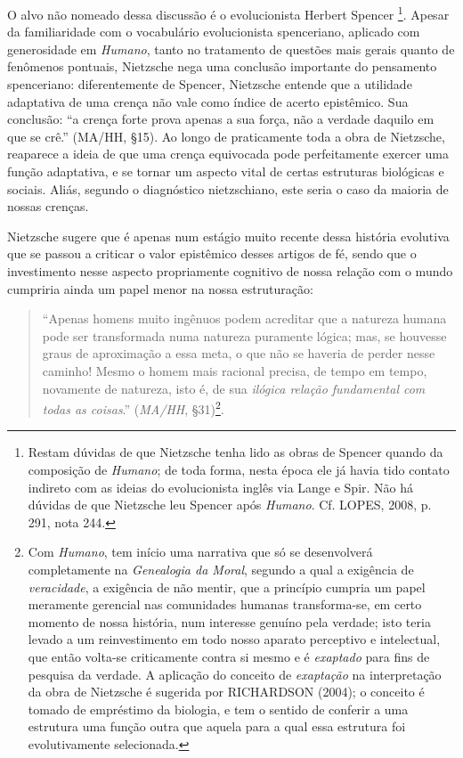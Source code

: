 \documentclass[
	12pt,				%
	openright,			%
	oneside,			%
	a4paper,			%
	english,			%
	french,				%
	spanish,			%
	brazil				%
	]{abntex2}
\begin{document}
O alvo não nomeado dessa discussão é o evolucionista Herbert Spencer
\footnote{Restam dúvidas de que Nietzsche tenha lido as obras de Spencer quando da composição de \textit{Humano}; de toda forma, nesta época ele já havia tido contato indireto com as ideias do evolucionista inglês via Lange e Spir. Não há dúvidas de que Nietzsche leu Spencer após \textit{Humano}. Cf. LOPES, 2008, p. 291, nota 244.}. 
Apesar da familiaridade com o vocabulário evolucionista spenceriano, aplicado com generosidade em \textit{Humano}, tanto no tratamento de questões mais gerais quanto de fenômenos pontuais, Nietzsche nega uma conclusão importante do pensamento spenceriano: diferentemente de Spencer, Nietzsche entende que a utilidade adaptativa de uma crença não vale como índice de acerto epistêmico. Sua conclusão: “a crença forte prova apenas a sua força, não a verdade daquilo em que se crê.” (MA/HH, §15). Ao longo de praticamente toda a obra de Nietzsche, reaparece a ideia de que uma crença equivocada pode perfeitamente exercer uma função adaptativa, e se tornar um aspecto vital de certas estruturas biológicas e sociais. Aliás, segundo o diagnóstico nietzschiano, este seria o caso da maioria de nossas crenças.

Nietzsche sugere que é apenas num estágio muito recente dessa história evolutiva que se passou a criticar o valor epistêmico desses artigos de fé, sendo que o investimento nesse aspecto propriamente cognitivo de nossa relação com o mundo cumpriria ainda um papel menor na nossa estruturação: 

\begin{quotation}
“Apenas homens muito ingênuos podem acreditar que a natureza humana pode ser transformada numa natureza puramente lógica; mas, se houvesse graus de aproximação a essa meta, o que não se haveria de perder nesse caminho! Mesmo o homem mais racional precisa, de tempo em tempo, novamente de natureza, isto é, de sua \textit{ilógica relação fundamental com todas as coisas}.” (\textit{MA/HH}, §31)\footnote{Com \textit{Humano}, tem início uma narrativa que só se desenvolverá completamente na \textit{Genealogia da Moral}, segundo a qual a exigência de \textit{veracidade}, a exigência de não mentir, que a princípio cumpria um papel meramente gerencial nas comunidades humanas transforma-se, em certo momento de nossa história, num interesse genuíno pela verdade; isto teria levado a um reinvestimento em todo nosso aparato perceptivo e intelectual, que então volta-se criticamente contra si mesmo e é \textit{exaptado} para fins de pesquisa da verdade. A aplicação do conceito de \textit{exaptação} na interpretação da obra de Nietzsche é sugerida por RICHARDSON (2004); o conceito é tomado de empréstimo da biologia, e tem o sentido de conferir a uma estrutura uma função outra que aquela para a qual essa estrutura foi evolutivamente selecionada.}.
\end{quotation}
\end{document}

